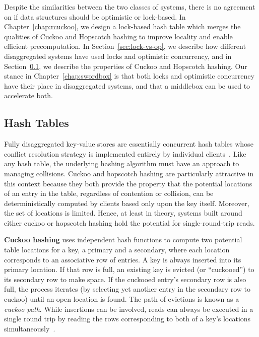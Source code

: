 \documentclass[12pt]{ucsddissertation}
\begin{document}
Despite the similarities between the two classes of systems, there is no agreement on if data
structures should be optimistic or lock-based. In Chapter~\ref{chap:rcuckoo}, we design a lock-based
hash table which merges the qualities of Cuckoo and Hopscotch hashing to improve locality and enable
efficient precomputation. In Section~\ref{sec:lock-vs-op}, we describe how different disaggregated
systems have used locks and optimistic concurrency, and in Section~\ref{sec:hashtables}, we describe
the properties of Cuckoo and Hopscotch hashing. Our stance in Chapter~\ref{chap:swordbox} is that
both locks and optimistic concurrency have their place in disaggregated systems, and that a
middlebox can be used to accelerate both.



\subsection{Hash Tables}
\label{sec:hashtables}

Fully disaggregated key-value stores are essentially concurrent hash tables whose conflict
resolution strategy is implemented entirely by individual clients~\cite{rolex,fusee,race}. Like any
hash table, the underlying hashing algorithm must have an approach to managing collisions. Cuckoo
and hopscotch hashing are particularly attractive in this context because they both provide the
property that the potential locations of an entry in the table, regardless of contention or
collision, can be deterministically computed by clients based only upon the key itself. Moreover,
the set of locations is limited. Hence, at least in theory, systems built around either cuckoo or
hopscotch hashing hold the potential for single-round-trip reads.

\textbf{Cuckoo hashing} uses independent hash functions to compute two potential table locations for
a key, a primary and a secondary, where each location corresponds to an associative row of entries.
A key is always inserted into its primary location. If that row is full, an existing key is evicted
(or “cuckooed”) to its secondary row to make space. If the cuckooed entry’s secondary row is also
full, the process iterates (by selecting yet another entry in the secondary row to cuckoo) until an
open location is found. The path of evictions is known as a \textit{cuckoo path}. While insertions
can be involved, reads can always be executed in a single round trip by reading the rows
corresponding to both of a key’s locations simultaneously~\cite{pilaf}.
\end{document}
